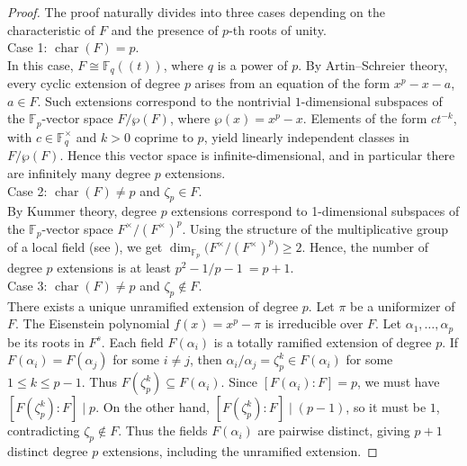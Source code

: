 \documentclass[10pt]{amsart}
\theoremstyle{plain}
\theoremstyle{definition}
\begin{document}
\begin{proof}
The proof naturally divides into three cases depending on the characteristic of \(F\) and the presence of \(p\)-th roots of unity.\\
Case 1: \(\operatorname{char}(F)= p\). \\
In this case, \(F \cong \mathbb{F}_q((t))\), where \(q\) is a power of \(p\). By Artin--Schreier theory, every cyclic extension of degree \(p\) arises from an equation of the form \(x^p-x-a\), \(a \in F\). Such extensions correspond to the nontrivial \(1\)-dimensional subspaces of the \(\mathbb{F}_p\)-vector space \(F / \wp(F)\), where \(\wp(x)=x^p-x\). Elements of the form \(c t^{-k}\), with \(c \in \mathbb{F}_q^\times\) and \(k>0\) coprime to \(p\), yield linearly independent classes in \(F/\wp(F)\). Hence this vector space is infinite-dimensional, and in particular there are infinitely many degree \(p\) extensions.\\
Case 2: \(\operatorname{char}(F)\neq p\) and \(\zeta_p \in F\).\\
By Kummer theory, degree \(p\) extensions correspond to 1-dimensional subspaces of the \(\mathbb{F}_p\)-vector space \( F^\times / (F^\times)^p\). Using the structure of the multiplicative group of a local field (see \cite[Proposition 5.7]{neukirch2010algebraic}), we get \(\dim_{\mathbb{F}_p}\bigl(F^\times / (F^\times)^p\bigr) \ge 2\). Hence, the number of degree \(p\) extensions is at least \(p^2-1/p-1\ = p+1\).\\
Case 3: \(\operatorname{char}(F)\neq p\) and \(\zeta_p \notin F\). \\
There exists a unique unramified extension of degree \(p\). Let \(\pi\) be a uniformizer of \(F\). The Eisenstein polynomial \(f(x)=x^p-\pi\) is irreducible over \(F\). Let \(\alpha_1,\dots,\alpha_p\) be its roots in \(F^s\). Each field \(F(\alpha_i)\) is a totally ramified extension of degree \(p\). If \(F(\alpha_i)=F(\alpha_j)\) for some \(i \ne j\), then \(\alpha_i / \alpha_j = \zeta_p^k \in F(\alpha_i) \) for some \(1 \leq k \leq p-1\). Thus
\(F(\zeta_p^k) \subseteq F(\alpha_i)\). Since \([F(\alpha_i):F]=p\), we must have \([F(\zeta_p^k):F] \mid p\). On the other hand, \([F(\zeta_p^k):F]\mid (p-1)\), so it must be \(1\), contradicting \(\zeta_p \notin F\). Thus the fields \(F(\alpha_i)\) are pairwise distinct, giving \(p+1\) distinct degree \(p\) extensions, including the unramified extension.
\end{proof}
\end{document}
